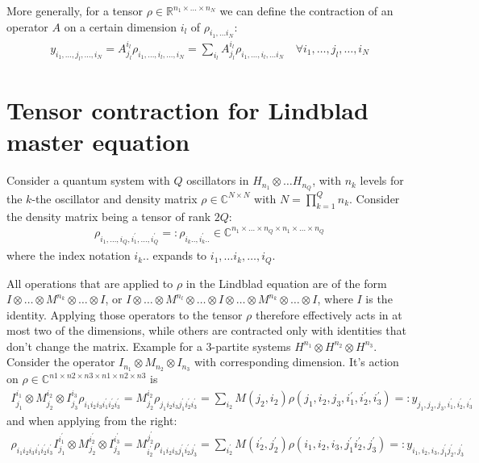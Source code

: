 \documentclass[letterpaper]{article}
\newcommand{\R}{\mathds{R}}
\newcommand{\C}{\mathds{C}}
\begin{document}
More generally, for a tensor $\rho \in \R^{n_1\times \dots \times n_N}$ we can define the contraction of an operator $A$ on a certain dimension $i_l$ of $\rho_{i_1,\dots i_N}$:
\begin{align}
    y_{i_1,\dots,j_l,\dots,i_N} = A_{j_l}^{i_l} \rho_{i_1,\dots,i_l,\dots,i_N} = \sum_{i_l} A_{j_l}^{i_l} \rho_{i_1,\dots,i_l,\dots i_N} \quad \forall i_1,\dots, j_l,\dots,i_N
\end{align}



\section{Tensor contraction for Lindblad master equation}
Consider a quantum system with $Q$ oscillators in $H_{n_1} \otimes \dots H_{n_Q}$, with $n_k$ levels for the $k$-the oscillator and density matrix $\rho \in \C^{N\times N}$ with $N=\prod_{k=1}^{Q} n_k$. Consider the density matrix being a tensor of rank $2Q$: 
\begin{align}
    \rho_{i_1,\dots, i_Q, i_1^{\prime}, \dots, i_Q^{\prime}} =: \rho_{i_k .., i_k^\prime..}\in\C^{n_1\times \dots \times n_Q \times n_1 \times \dots \times n_Q}
\end{align}
where the index notation $i_k..$ expands to $i_1,\dots i_k, \dots,i_Q$.

All operations that are applied to $\rho$ in the Lindblad equation are of the form $I\otimes \dots \otimes M^{n_k} \otimes \dots \otimes I$, or $I\otimes \dots \otimes M^{n_l} \otimes \dots \otimes I \otimes \dots \otimes M^{n_k} \otimes \dots \otimes I$, where $I$ is the identity. Applying those operators to the tensor $\rho$ therefore effectively acts in at most two of the dimensions, while others are contracted only with identities that don't change the matrix. Example for a 3-partite systems $H^{n_1} \otimes H^{n_2} \otimes H^{n_3}$. Consider the operator $I_{n_1} \otimes M_{n_2} \otimes I_{n_3}$ with corresponding dimension. It's action on $\rho \in \C^{n1\times n2\times n3 \times n1\times n2 \times n3}$ is
\begin{align}
    I^{i_1}_{j_1}\otimes M^{i_2}_{j_2} \otimes I^{i_3}_{j_3} \rho_{i_1i_2i_3i_1^{\prime}i_2^\prime i_3^\prime} = M^{i_2}_{j_2} \rho_{j_1i_2i_3j_1^{\prime}i_2^\prime i_3^\prime} = \sum_{i_2} M(j_2, i_2) \rho(j_1,i_2,j_3,i_1^{\prime},i_2^\prime, i_3^\prime)  =: y_{j_1,j_2,j_3,i_1^{\prime},i_2^\prime,i_3^\prime}
\end{align}
and when applying from the right:
\begin{align}
    \rho_{i_1i_2i_3i_1^{\prime}i_2^\prime i_3^\prime}I^{i_1^{\prime}}_{j_1}\otimes M^{i_2^\prime}_{j_2} \otimes I^{i_3^\prime}_{j_3}  = M^{j_2^\prime}_{i_2^\prime} \rho_{i_1i_2i_3j_1^{\prime}i_2^\prime j_3^\prime} = \sum_{i_2^\prime} M(i_2^{\prime}, j_2^\prime) \rho(i_1,i_2,i_3,j_1^{\prime}i_2^\prime, j_3^\prime)  =: y_{i_1,i_2,i_3,j_1^{\prime}j_2^\prime, j_3^\prime}
\end{align}
\end{document}
